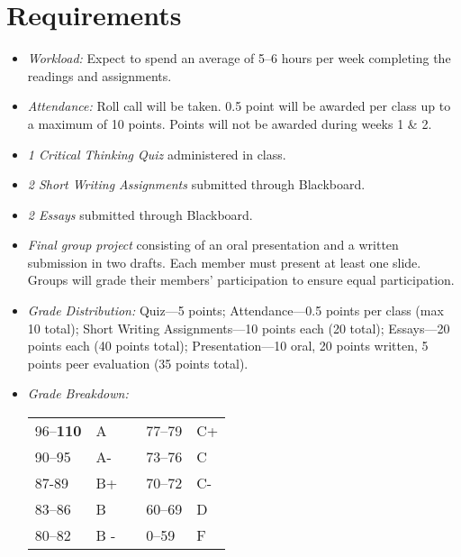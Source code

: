 \documentclass[article,oneside]{memoir}
\begin{document}
\section{Requirements}

\begin{itemize}
\item \textit{Workload:} Expect to spend an average of 5--6 hours per week  completing the readings and assignments.

\item \textit{Attendance:} Roll call will be taken. 0.5 point will be awarded per class up to a maximum of 10 points. Points will not be awarded during weeks 1 \& 2. 

\item \textit{1 Critical Thinking Quiz} administered in class. 

\item \textit{2 Short Writing Assignments} submitted through Blackboard. 

\item \textit{2 Essays} submitted through Blackboard. 

\item \textit{Final group project} consisting of an oral presentation and a written submission in two drafts. Each member must present at least one slide. Groups will grade their members' participation to ensure equal participation. 

\item \textit{Grade Distribution:}  Quiz---5 points; Attendance---0.5 points per class (max 10 total);  Short Writing Assignments---10 points each (20 total); Essays---20 points each (40 points total); Presentation---10 oral, 20 points written, 5 points peer evaluation (35 points total).

\item \textit{Grade Breakdown:}

 \begin{tabular}{ | l | l | p{2cm} | l | l | }
    \hline 
96--\textbf{110} & A  & &  77--79 &  C+ \\  
90--95 & A- & &  73--76 & C \\
87-89 & B+ &  &  70--72 & C- \\ 
83--86 & B  & &  60--69 & D\\
80--82 & B - & & 0--59 & F\\ \hline
    \end{tabular}


\end{itemize}
\end{document}
